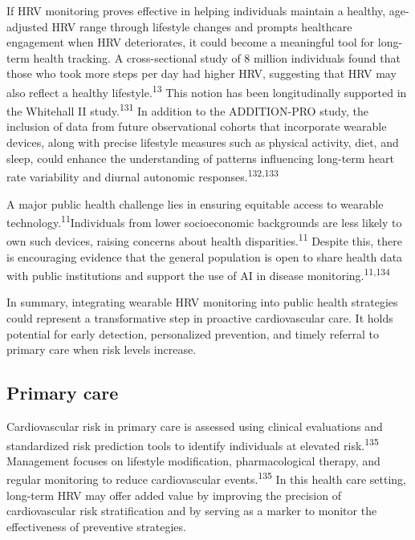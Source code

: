 \documentclass[
  letterpaper,
  headsepline=true,
  open=any]{scrbook}
\begin{document}
If HRV monitoring proves effective in helping individuals maintain a
healthy, age-adjusted HRV range through lifestyle changes and prompts
healthcare engagement when HRV deteriorates, it could become a
meaningful tool for long-term health tracking. A cross-sectional study
of 8 million individuals found that those who took more steps per day
had higher HRV, suggesting that HRV may also reflect a healthy
lifestyle.\textsuperscript{13} This notion has been longitudinally
supported in the Whitehall II study.\textsuperscript{131} In addition to
the ADDITION-PRO study, the inclusion of data from future observational
cohorts that incorporate wearable devices, along with precise lifestyle
measures such as physical activity, diet, and sleep, could enhance the
understanding of patterns influencing long-term heart rate variability
and diurnal autonomic responses.\textsuperscript{132,133}

A major public health challenge lies in ensuring equitable access to
wearable technology.\textsuperscript{11}Individuals from lower
socioeconomic backgrounds are less likely to own such devices, raising
concerns about health disparities.\textsuperscript{11} Despite this,
there is encouraging evidence that the general population is open to
share health data with public institutions and support the use of AI in
disease monitoring.\textsuperscript{11,134}

In summary, integrating wearable HRV monitoring into public health
strategies could represent a transformative step in proactive
cardiovascular care. It holds potential for early detection,
personalized prevention, and timely referral to primary care when risk
levels increase.

\hypertarget{primary-care}{%
\subsection{Primary care}\label{primary-care}}

Cardiovascular risk in primary care is assessed using clinical
evaluations and standardized risk prediction tools to identify
individuals at elevated risk.\textsuperscript{135} Management focuses on
lifestyle modification, pharmacological therapy, and regular monitoring
to reduce cardiovascular events.\textsuperscript{135} In this health
care setting, long-term HRV may offer added value by improving the
precision of cardiovascular risk stratification and by serving as a
marker to monitor the effectiveness of preventive strategies.
\end{document}
